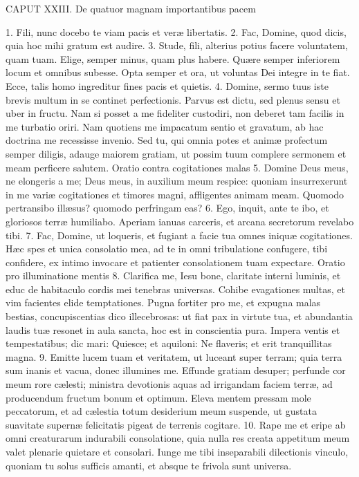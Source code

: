 CAPUT XXIII.
De quatuor magnam importantibus pacem

1. Fili, nunc docebo te viam pacis et veræ libertatis.
2. Fac, Domine, quod dicis, quia hoc mihi gratum est audire.
3. Stude, fili, alterius potius facere voluntatem, quam tuam. Elige, semper minus, quam plus habere. Quære semper inferiorem locum et omnibus subesse. Opta semper et ora, ut voluntas Dei integre in te fiat. Ecce, talis homo ingreditur fines pacis et quietis.
4. Domine, sermo tuus iste brevis multum in se continet perfectionis. Parvus est dictu, sed plenus sensu et uber in fructu. Nam si posset a me fideliter custodiri, non deberet tam facilis in me turbatio oriri. Nam quotiens me impacatum sentio et gravatum, ab hac doctrina me recessisse invenio. Sed tu, qui omnia potes et animæ profectum semper diligis, adauge maiorem gratiam, ut possim tuum complere sermonem et meam perficere salutem.
Oratio contra cogitationes malas
5. Domine Deus meus, ne elongeris a me; Deus meus, in auxilium meum respice: quoniam insurrexerunt in me variæ cogitationes et timores magni, affligentes animam meam. Quomodo pertransibo illæsus? quomodo perfringam eas?
6. Ego, inquit, ante te ibo, et gloriosos terræ humiliabo. Aperiam ianuas carceris, et arcana secretorum revelabo tibi.
7. Fac, Domine, ut loqueris, et fugiant a facie tua omnes iniquæ cogitationes. Hæc spes et unica consolatio mea, ad te in omni tribulatione confugere, tibi confidere, ex intimo invocare et patienter consolationem tuam expectare.
Oratio pro illuminatione mentis
8. Clarifica me, Iesu bone, claritate interni luminis, et educ de habitaculo cordis mei tenebras universas. Cohibe evagationes multas, et vim facientes elide temptationes. Pugna fortiter pro me, et expugna malas bestias, concupiscentias dico illecebrosas: ut fiat pax in virtute tua, et abundantia laudis tuæ resonet in aula sancta, hoc est in conscientia pura. Impera ventis et tempestatibus; dic mari: Quiesce; et aquiloni: Ne flaveris; et erit tranquillitas magna.
9. Emitte lucem tuam et veritatem, ut luceant super terram; quia terra sum inanis et vacua, donec illumines me. Effunde gratiam desuper; perfunde cor meum rore cælesti; ministra devotionis aquas ad irrigandam faciem terræ, ad producendum fructum bonum et optimum. Eleva mentem pressam mole peccatorum, et ad cælestia totum desiderium meum suspende, ut gustata suavitate supernæ felicitatis pigeat de terrenis cogitare.
10. Rape me et eripe ab omni creaturarum indurabili consolatione, quia nulla res creata appetitum meum valet plenarie quietare et consolari. Iunge me tibi inseparabili dilectionis vinculo, quoniam tu solus sufficis amanti, et absque te frivola sunt universa.


